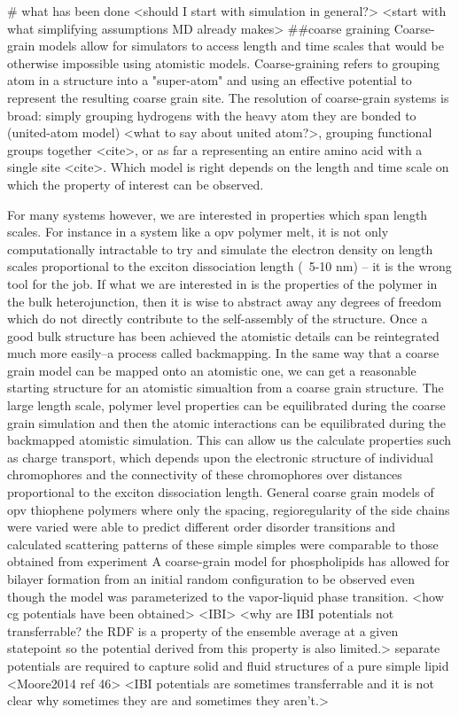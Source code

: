 # what has been done
<should I start with simulation in general?>
<start with what simplifying assumptions MD already makes>
##coarse graining
Coarse-grain models allow for simulators to access length and time scales that would be otherwise impossible using atomistic models. Coarse-graining refers to grouping atom in a structure into a "super-atom" and using an effective potential to represent the resulting coarse grain site. The resolution of coarse-grain systems is broad: simply grouping hydrogens with the heavy atom they are bonded to (united-atom model) <what to say about united atom?>\cite{Paul1995a, Yang2006a,}, grouping functional groups together <cite>, or as far a representing an entire amino acid with a single site <cite>. Which model is right depends on the length and time scale on which the property of interest can be observed. 

For many systems however, we are interested in properties which span length scales. For instance in a system like a opv polymer melt, it is not only computationally intractable to try and simulate the electron density on length scales proportional to the exciton dissociation length (~5-10 nm) -- it is the wrong tool for the job. If what we are interested in is the properties of the polymer in the bulk heterojunction, then it is wise to abstract away any degrees of freedom which do not directly contribute to the self-assembly of the structure. Once a good bulk structure has been achieved the atomistic details can be reintegrated much more easily--a process called backmapping. In the same way that a coarse grain model can be mapped onto an atomistic one, we can get a reasonable starting structure for an atomistic simualtion from a coarse grain structure. The large length scale, polymer level properties can be equilibrated during the coarse grain simulation and then the atomic interactions can be equilibrated during the backmapped atomistic simulation. This can allow us the calculate properties such as charge transport, which depends upon the electronic structure of individual chromophores and the connectivity of these chromophores over distances proportional to the exciton dissociation length.
General coarse grain models of opv thiophene polymers where only the spacing, regioregularity of the side chains were varied were able to predict different order disorder transitions and calculated scattering patterns of these simple simples were comparable to those obtained from experiment \cite{Jankowski2013, Marsh2014} 
A coarse-grain model for phospholipids has allowed for bilayer formation from an initial random configuration to be observed even though the model was parameterized to the vapor-liquid phase transition. \cite{Shelley2001}
<how cg potentials have been obtained>
<IBI>
<why are IBI potentials not transferrable? the RDF is a property of the ensemble average at a given statepoint so the potential derived from this property is also limited.>
separate potentials are required to capture solid and fluid structures of a pure simple lipid <Moore2014 ref 46>
<IBI potentials are sometimes transferrable and it is not clear why sometimes they are and sometimes they aren't.> \cite{Moore2014}

